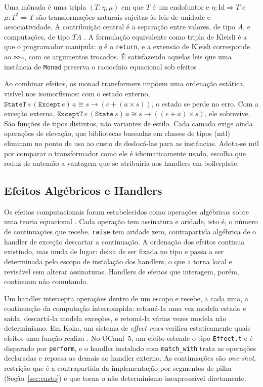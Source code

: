 \documentclass[12pt]{article}
\begin{document}
Uma mônada é uma tripla $(T,\eta,\mu)$ em que $T$ é um endofuntor e
$\eta:\mathrm{Id}\Rightarrow T$ e $\mu:T^2\Rightarrow T$ são transformações
naturais sujeitas às leis de unidade e associatividade. A contribuição central
é a separação entre valores, de tipo $A$, e computações, de tipo $TA$
\cite{moggi:91}. A formulação equivalente como tripla de Kleisli é a que o
programador manipula: $\eta$ é o \texttt{return}, e a extensão de Kleisli
corresponde ao \texttt{>{}>=}, com os argumentos trocados. É satisfazendo
aquelas leis que uma instância de \texttt{Monad} preserva o raciocínio
equacional sob efeitos \cite{wadler:90,wadler:92}.

Ao combinar efeitos, os monad transformers \cite{liang:95} impõem
uma ordenação estática, visível nos isomorfismos: com o estado externo,
$\texttt{StateT}\,s\,(\texttt{Except}\,e)\,a \cong s \to (e + (a \times s))$,
o estado se perde no erro. Com a exceção externa,
$\texttt{ExceptT}\,e\,(\texttt{State}\,s)\,a \cong s \to ((e + a) \times s)$,
ele sobrevive. São funções de tipos distintos, não variantes de estilo. Cada
camada exige ainda operações de elevação, que bibliotecas baseadas em classes
de tipos (mtl) eliminam no ponto de uso ao custo de deslocá-las para
as instâncias. Adota-se mtl por comparar o transformador como ele é
idiomaticamente usado, escolha que reduz de antemão a vantagem que se
atribuiria aos handlers em boilerplate.

\subsection{Efeitos Algébricos e Handlers}\label{sec:fund-efeitos}

Os efeitos computacionais foram estabelecidos como operações algébricas sobre
uma teoria equacional \cite{plotkin:03}. Cada operação tem assinatura e
aridade, isto é, o número de continuações que recebe. \texttt{raise} tem
aridade zero, contrapartida algébrica de o handler de exceção
descartar a continuação. A ordenação dos efeitos continua existindo, mas muda
de lugar: deixa de ser fixada no tipo e passa a ser determinada pelo escopo de
instalação dos handlers, o que a torna local e revisável sem alterar
assinaturas. Handlers de efeitos que interagem, porém, continuam não
comutando.

Um handler \cite{plotkin:09} intercepta operações dentro de um escopo
e recebe, a cada uma, a continuação da computação interrompida: retomá-la uma
vez modela estado e saída, descartá-la modela exceções, e retomá-la várias
vezes modela não determinismo. Em Koka, um sistema de \textit{effect rows} verifica estaticamente quais
efeitos uma função realiza \cite{leijen:14}. No OCaml~5,
um efeito estende o tipo \texttt{Effect.t} e é disparado por \texttt{perform},
e o handler instalado com \texttt{match\_with} trata as operações
declaradas e repassa as demais ao handler externo. As continuações
são \textit{one-shot}, restrição que é a contrapartida da implementação por
segmentos de pilha (Seção~\ref{sec:custo}) e que torna o não determinismo
inexpressável diretamente.
\end{document}
